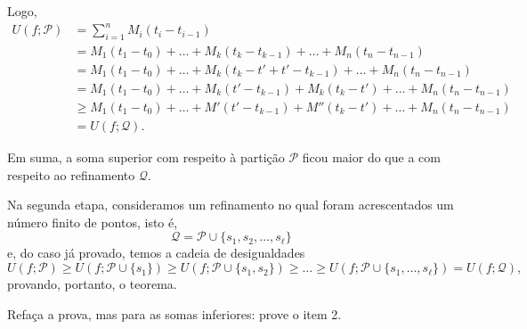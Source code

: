 \documentclass[../analysisII_notes.tex]{subfiles}
\begin{document}
\begin{proof*}
	Logo,
	\begin{align*}
		U(f; \mathcal{P}) & = \sum\limits_{i=1}^{n}M_{i}(t_{i}-t_{i-1})                                                         \\
		                  & = M_{1}(t_{1}-t_{0}) + \dotsc + M_{k}(t_{k}-t_{k-1}) + \dotsc + M_{n}(t_{n}-t_{n-1})                \\
		                  & = M_{1}(t_{1}-t_{0}) + \dotsc + M_{k}(t_{k}-t'+t'-t_{k-1}) + \dotsc + M_{n}(t_{n}-t_{n-1})          \\
		                  & = M_{1}(t_{1}-t_{0}) + \dotsc + M_{k}(t'-t_{k-1}) + M_{k}(t_{k}-t') + \dotsc + M_{n}(t_{n}-t_{n-1}) \\
		                  & \geq M_{1}(t_{1}-t_{0}) + \dotsc + M'(t'-t_{k-1}) + M''(t_{k}-t') + \dotsc + M_{n}(t_{n}-t_{n-1})   \\
		                  & = U(f; \mathcal{Q}).
	\end{align*}

	Em suma, a soma superior com respeito à partição \(\mathcal{P}\) ficou maior do que a com respeito ao refinamento \(\mathcal{Q}\).

	Na segunda etapa, consideramos um refinamento no qual foram acrescentados um número finito de pontos, isto é,
	\[
		\mathcal{Q} = \mathcal{P}\cup \{s_{1}, s_{2}, \dotsc , s_{\ell }\}
	\]
	e, do caso já provado, temos a cadeia de desigualdades
	\[
		U(f; \mathcal{P}) \geq U(f; \mathcal{P}\cup \{s_{1}\}) \geq U(f; \mathcal{P}\cup \{s_1, s_2\}) \geq \dotsc \geq U(f; \mathcal{P}\cup \{s_1, \dotsc , s_{\ell }\}) = U(f; \mathcal{Q}),
	\]
	provando, portanto, o teorema. \qedsymbol
\end{proof*}
\begin{exr}
	Refaça a prova, mas para as somas inferiores: prove o item 2.
\end{exr}
\end{document}
